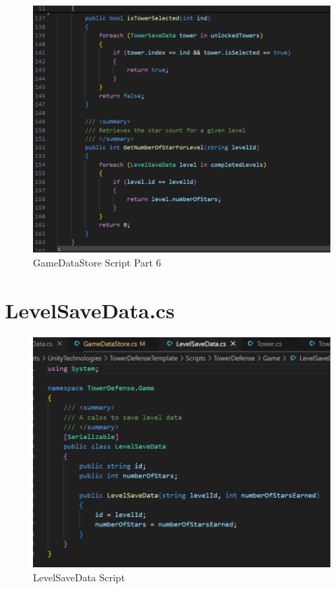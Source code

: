 \documentclass[12pt,a4paper]{report}
\begin{document}
\begin{figure}[h!]
	\centering
	\includegraphics[scale=0.75]{images/GameDataStore6.png}
	\caption{GameDataStore Script Part 6}
	\label{fig:GameDataStore6}
\end{figure}
 
\section{LevelSaveData.cs}
 
\begin{figure}[h!]
	\centering
	\includegraphics[scale=0.75]{images/LevelSaveData.png}
	\caption{LevelSaveData Script}
	\label{fig:LevelSaveData}
\end{figure}
\end{document}
